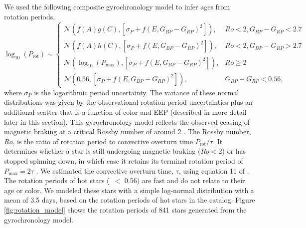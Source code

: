 We used the following composite gyrochronology model to infer ages from
rotation periods,
\begin{equation}
    \log_{10}(P_\mathrm{rot}) \sim \begin{cases}
        \mathcal{N}\left(f(A)g(C), [\sigma_P+f(E, G_{BP} - G_{RP})^2]\right), & Ro < 2,
        G_{BP} - G_{RP} < 2.7 \\
        \mathcal{N}(f(A)h(C), [\sigma_P+f(E, G_{BP} - G_{RP})^2]), & Ro < 2,
        G_{BP} - G_{RP} > 2.7 \\
        \mathcal{N}(\log_{10}(P_\mathrm{max}), [\sigma_P+f(E, G_{BP} - G_{RP})^2]),& Ro \geq 2 \\
        \mathcal{N}(0.56, [\sigma_P+f(E, G_{BP}-G_{RP})^2]),& G_{BP} - G_{RP} <
        0.56,
    \end{cases}
\label{eqn:gyro}
\end{equation}
where $\sigma_P$ is the logarithmic period uncertainty.
The variance of these normal distributions was given by the observational
rotation period uncertainties plus an additional scatter that is a function
of color and EEP (described in more detail later in this section).
This gyrochronology model reflects the observed ceasing of magnetic braking at
a critical Rossby number of around 2 \citep{vansaders2016}.
The Rossby number, $Ro$, is the ratio of rotation period to convective
overturn time $P_{\mathrm{rot}}/\tau$.
It determines whether a star is still undergoing magnetic braking ($Ro < 2$)
or has stopped spinning down, in which case it retains its terminal rotation
period of $P_\mathrm{max} = 2\tau$ \citep{vansaders2016}.
We estimated the convective overturn time, $\tau$, using equation 11 of
\citet{wright2011}.
The rotation periods of hot stars (\gcolor\ $<$ 0.56) are fast and do
not relate to their age or color.
We modeled these stars with a simple log-normal distribution with a mean of
3.5 days, based on the rotation periods of hot stars in the
\citet{mcquillan2014} catalog.
Figure \ref{fig:rotation_model} shows the rotation periods of 841
stars generated from the gyrochronology model.
